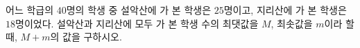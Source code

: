 어느 학급의 $40$명의 학생 중 설악산에 가 본 학생은 $25$명이고, 지리산에 가 본 학생은 $18$명이었다. 설악산과 지리산에 모두 가 본 학생 수의 최댓값을 $M$, 최솟값을 $m$이라 할 때, $M+m$의 값을 구하시오.

